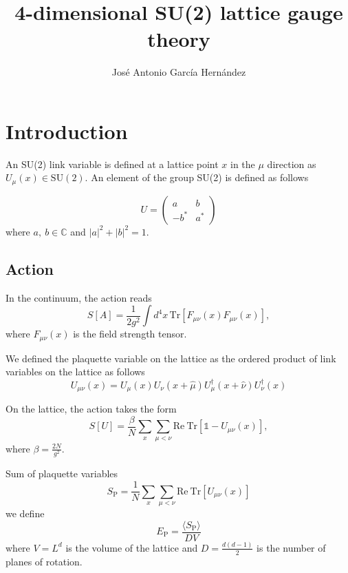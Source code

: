 \documentclass[12pt,a4paper]{article}
\author{José Antonio García Hernández}
\title{4-dimensional SU(2) lattice gauge theory}
\begin{document}
\maketitle

\section{Introduction}
An SU(2) link variable is defined at a lattice point $x$ in the $\mu$ direction as $U _{\mu}(x)\in \text{SU}(2)$. An element of the group SU(2) is defined as follows

\begin{equation}
	\label{eq:SU2_element}
	U = \begin{pmatrix}
		a & b \\
		-b^* & a^*
	\end{pmatrix}
\end{equation}
where $a, \ b \in \mathbb{C}$ and $|a|^2 + |b|^2 = 1$.

\subsection{Action}
In the continuum, the action reads
\begin{equation}
	\label{eq:continuum_action}
	S[A] = \frac{1}{2g^2} \int d^4x \, \text{Tr} \left[ F_{\mu\nu}(x)F_{\mu\nu}(x)\right],
\end{equation}
where $F_{\mu\nu}(x)$ is the field strength tensor.

We defined the plaquette variable on the lattice as the ordered product of link variables on the lattice as follows
\begin{equation}
	\label{eq:plaquette}
	U_{\mu\nu}(x) = U_{\mu}(x)U_{\nu}(x+\hat{\mu})U_{\mu}^{\dagger}(x+\hat{\nu})U_{\nu}^{\dagger}(x) 
\end{equation}


On the lattice, the action takes the form
\begin{equation}
	\label{eq:wilson_action}
	S[U] = \frac{\beta}{N}\sum_x \sum_{\mu < \nu} \text{Re}\ \text{Tr} \left[\mathds{1} - U_{\mu\nu}(x) \right],
\end{equation}
where $\beta = \frac{2N}{g^2}$.

Sum of plaquette variables
\begin{equation}
	\label{eq:Sp}
	S_{\text{P}} = \frac{1}{N} \sum_x\sum_{\mu < \nu} \text{Re}\ \text{Tr} [U_{\mu\nu}(x)]
\end{equation}
we define
\begin{equation}
	\label{eq:Ep}
	E_{\text{P}} =\frac{ \langle S_{\text{P}} \rangle}{D V}
\end{equation}
where $V=L^d$ is the volume of the lattice and $D = \frac{d(d-1)}{2}$ is the number of planes of rotation.
\end{document}
